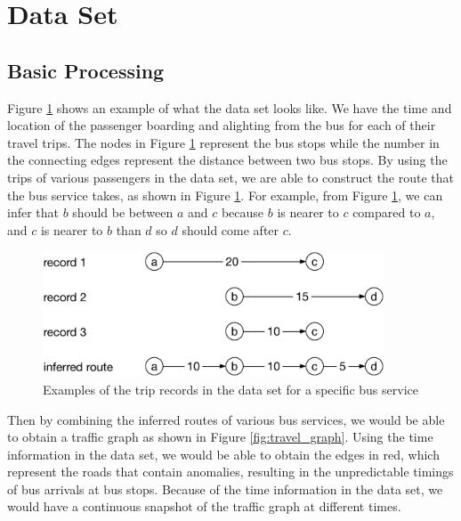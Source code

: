 \documentclass{sig-alternate}
\begin{document}

\section{Data Set}

\subsection{Basic Processing}

Figure \ref{fig:trip_example} shows an example of what the data set looks like. We have the time and location of the passenger boarding and alighting from the bus for each of their travel trips. The nodes in Figure \ref{fig:trip_example} represent the bus stops while the number in the connecting edges represent the distance between two bus stops. By using the trips of various passengers in the data set, we are able to construct the route that the bus service takes, as shown in Figure \ref{fig:trip_example}. For example, from Figure \ref{fig:trip_example}, we can infer that $b$ should be between $a$ and $c$ because $b$ is nearer to $c$ compared to $a$, and $c$ is nearer to $b$ than $d$ so $d$ should come after $c$.

\begin{figure}[htb]
	\centering
	\includegraphics[width=4.0in]{trip_example}
	\caption{Examples of the trip records in the data set for a specific bus service}
	\label{fig:trip_example}
\end{figure}

Then by combining the inferred routes of various bus services, we would be able to obtain a traffic graph as shown in Figure \ref{fig:travel_graph}. Using the time information in the data set, we would be able to obtain the edges in red, which represent the roads that contain anomalies, resulting in the unpredictable timings of bus arrivals at bus stops. Because of the time information in the data set, we would have a continuous snapshot of the traffic graph at different times.
\end{document}
